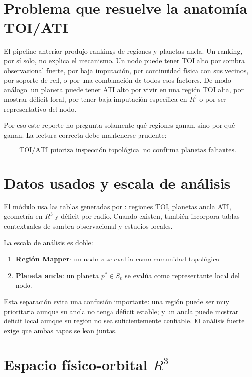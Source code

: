 \documentclass[11pt]{article}
\newcommand{\code}[1]{\texttt{\detokenize{#1}}}
\begin{document}
\section{Problema que resuelve la anatomía TOI/ATI}

El pipeline anterior produjo rankings de regiones y planetas ancla. Un ranking, por sí solo, no explica el mecanismo. Un nodo puede tener TOI alto por sombra observacional fuerte, por baja imputación, por continuidad física con sus vecinos, por soporte de red, o por una combinación de todos esos factores. De modo análogo, un planeta puede tener ATI alto por vivir en una región TOI alta, por mostrar déficit local, por tener baja imputación específica en $R^3$ o por ser representativo del nodo.

Por eso este reporte no pregunta solamente qué regiones ganan, sino por qué ganan. La lectura correcta debe mantenerse prudente:

\[
\boxed{\text{TOI/ATI prioriza inspección topológica; no confirma planetas faltantes.}}
\]

\section{Datos usados y escala de análisis}

El módulo usa las tablas generadas por \code{topological_incompleteness_index}: regiones TOI, planetas ancla ATI, geometría en $R^3$ y déficit por radio. Cuando existen, también incorpora tablas contextuales de sombra observacional y estudios locales.

La escala de análisis es doble:

\begin{enumerate}
    \item \textbf{Región Mapper}: un nodo $v$ se evalúa como comunidad topológica.
    \item \textbf{Planeta ancla}: un planeta $p^*\in S_v$ se evalúa como representante local del nodo.
\end{enumerate}

Esta separación evita una confusión importante: una región puede ser muy prioritaria aunque su ancla no tenga déficit estable; y un ancla puede mostrar déficit local aunque su región no sea suficientemente confiable. El análisis fuerte exige que ambas capas se lean juntas.

\section{Espacio físico-orbital $R^3$}
\end{document}
